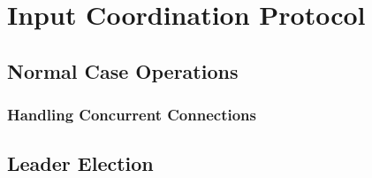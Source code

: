 \section{Input Coordination Protocol} \label{sec:input}


\subsection{Normal Case Operations} \label{sec:normal}








% 

\subsubsection{Handling Concurrent Connections} \label{sec:concurrent}




\subsection{Leader Election} \label{sec:election}

